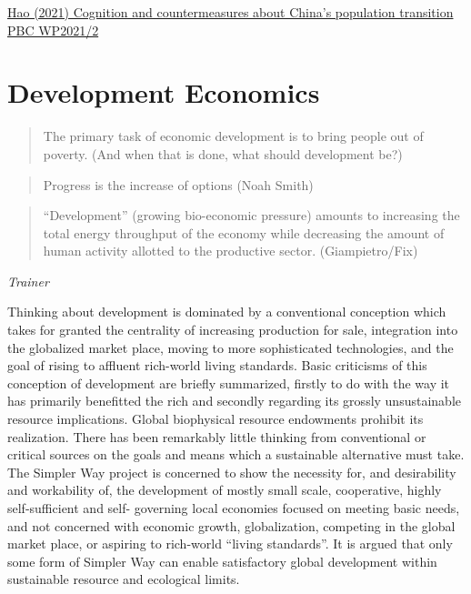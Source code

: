 \documentclass[
]{book}
\begin{document}
\href{http://www.pbc.gov.cn/redianzhuanti/118742/4122386/4122692/4214189/4215394/index.html}{Hao (2021) Cognition and countermeasures about China's population transition PBC WP2021/2}

\hypertarget{development-economics}{%
\chapter{Development Economics}\label{development-economics}}

\begin{quote}
The primary task of economic development is to bring people out of poverty.
(And when that is done, what should development be?)
\end{quote}

\begin{quote}
Progress is the increase of options (Noah Smith)
\end{quote}

\begin{quote}
``Development'' (growing bio-economic pressure) amounts to
increasing the total energy throughput of the economy while
decreasing the amount of human activity allotted to the productive sector.
(Giampietro/Fix)
\end{quote}

\emph{Trainer}

Thinking about development is dominated by a conventional conception which takes
for granted the centrality of increasing production for sale, integration into the
globalized market place, moving to more sophisticated technologies, and the goal of
rising to affluent rich-world living standards. Basic criticisms of this conception of
development are briefly summarized, firstly to do with the way it has primarily
benefitted the rich and secondly regarding its grossly unsustainable resource
implications. Global biophysical resource endowments prohibit its realization. There
has been remarkably little thinking from conventional or critical sources on the goals
and means which a sustainable alternative must take. The Simpler Way project is
concerned to show the necessity for, and desirability and workability of, the
development of mostly small scale, cooperative, highly self-sufficient and self-
governing local economies focused on meeting basic needs, and not concerned with
economic growth, globalization, competing in the global market place, or aspiring to
rich-world ``living standards''. It is argued that only some form of Simpler Way can
enable satisfactory global development within sustainable resource and ecological
limits.
\end{document}
